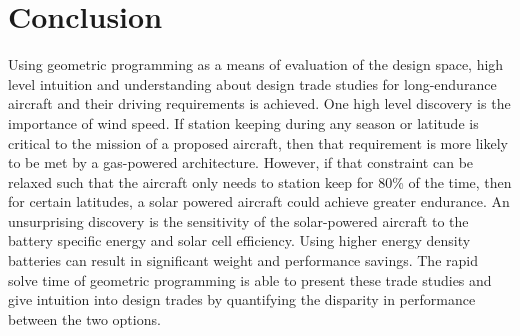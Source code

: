 



\section{Conclusion}

Using geometric programming as a means of evaluation of the design space, high level intuition and understanding about design trade studies for long-endurance aircraft and their driving requirements is achieved.  
One high level discovery is the importance of wind speed.  
If station keeping during any season or latitude is critical to the mission of a proposed aircraft, then that requirement is more likely to be met by a gas-powered architecture.
However, if that constraint can be relaxed such that the aircraft only needs to station keep for 80\% of the time, then for certain latitudes, a solar powered aircraft could achieve greater endurance.
An unsurprising discovery is the sensitivity of the solar-powered aircraft to the battery specific energy and solar cell efficiency.  Using higher energy density batteries can result in significant weight and performance savings.  
The rapid solve time of geometric programming is able to present these trade studies and give intuition into design trades by quantifying the disparity in performance between the two options.





